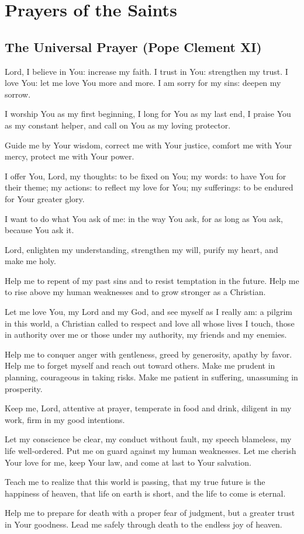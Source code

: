 \documentclass[12pt]{article}
\newcommand{\prayersection}[1]{\section{#1}}
\newcommand{\prayertitle}[1]{\subsection{#1}}
\begin{document}
\newpage

\prayersection{Prayers of the Saints}
\prayertitle{The Universal Prayer (Pope Clement XI)}
Lord, I believe in You: increase my faith.
I  trust in You: strengthen my trust.
I love You: let me love You more and more.
I am sorry for my sins: deepen my sorrow.

I worship You as my first beginning, I long for You as my last end, I praise You as my constant helper, and call on You as my loving protector.

Guide me by Your wisdom,
correct me with Your justice,
comfort me with Your mercy,
protect me with Your power.

I offer You, Lord, my thoughts: to be fixed on You;
my words: to have You for their theme;
my actions: to reflect my love for You;
my sufferings: to be endured for Your greater glory.

I want to do what You ask of me:
in the way You ask,
for as long as You ask,
because You ask it.

Lord, enlighten my understanding,
strengthen my will,
purify my heart,
and make me holy.

Help me to repent of my past sins and to resist temptation in the future.
Help me to rise above my human weaknesses and to grow stronger as a Christian.

Let me love You, my Lord and my God, and see myself as I really am:
a pilgrim in this world,
a Christian called to respect and love all whose lives I touch,
those in authority over me or those under my authority,
my friends and my enemies.

Help me to conquer anger with gentleness,
greed by generosity,
apathy by favor.
Help me to forget myself and reach out toward others.
Make me prudent in planning, courageous in taking risks.
Make me patient in suffering, unassuming in prosperity.

Keep me, Lord, attentive at prayer,
temperate in food and drink,
diligent in my work,
firm in my good intentions.

Let my conscience be clear,
my conduct without fault,
my speech blameless,
my life well-ordered.
Put me on guard against my human weaknesses.
Let me cherish Your love for me,
keep Your law,
and come at last to Your salvation.

Teach me to realize that this world is passing,
that my true future is the happiness of heaven,
that life on earth is short,
and the life to come is eternal.

Help me to prepare for death with a proper fear of judgment, but a greater trust in Your goodness.
Lead me safely through death to the endless joy of heaven.
\end{document}
